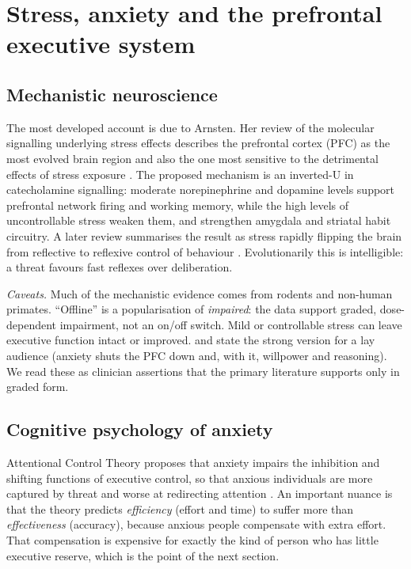 \section{Stress, anxiety and the prefrontal executive system}\label{sec:stress}
\subsection{Mechanistic neuroscience}
The most developed account is due to Arnsten. Her review of the molecular signalling underlying stress effects describes the prefrontal cortex (PFC) as the most evolved brain region and also the one most sensitive to the detrimental effects of stress exposure \citep{arnsten2009stress}. The proposed mechanism is an inverted-U in catecholamine signalling: moderate norepinephrine and dopamine levels support prefrontal network firing and working memory, while the high levels of uncontrollable stress weaken them, and strengthen amygdala and striatal habit circuitry. A later review summarises the result as stress rapidly flipping the brain from reflective to reflexive control of behaviour \citep{arnsten2015stress}. Evolutionarily this is intelligible: a threat favours fast reflexes over deliberation.

\emph{Caveats.} Much of the mechanistic evidence comes from rodents and non-human primates. ``Offline'' is a popularisation of \emph{impaired}: the data support graded, dose-dependent impairment, not an on/off switch. Mild or controllable stress can leave executive function intact or improved. \citet{brewer2021unwinding} and \citet{brewer2016habit} state the strong version for a lay audience (anxiety shuts the PFC down and, with it, willpower and reasoning). We read these as clinician assertions that the primary literature supports only in graded form.

\subsection{Cognitive psychology of anxiety}
Attentional Control Theory proposes that anxiety impairs the inhibition and shifting functions of executive control, so that anxious individuals are more captured by threat and worse at redirecting attention \citep{eysenck2007act}. An important nuance is that the theory predicts \emph{efficiency} (effort and time) to suffer more than \emph{effectiveness} (accuracy), because anxious people compensate with extra effort. That compensation is expensive for exactly the kind of person who has little executive reserve, which is the point of the next section.
